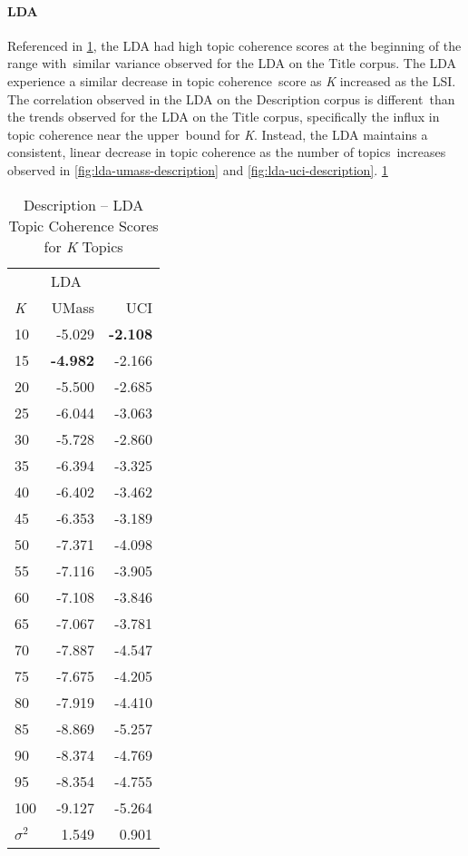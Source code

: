 \documentclass[letterpaper,12pt]{article}
\begin{document}
\paragraph{LDA}
Referenced in \ref{tab:lda_description_tc}, the LDA had high topic coherence scores at the beginning of the range with\
similar variance observed for the LDA on the Title corpus. The LDA experience a similar decrease in topic coherence\
score as \emph{K} increased as the LSI. The correlation observed in the LDA on the Description corpus is different\
than the trends observed for the LDA on the Title corpus, specifically the influx in topic coherence near the upper\
bound for \emph{K}. Instead, the LDA maintains a consistent, linear decrease in topic coherence as the number of topics\
increases observed in \ref{fig:lda-umass-description} and \ref{fig:lda-uci-description}.
\ref{tab:lda_description_tc}
\begin{table}
	\caption{\label{tab:lda_description_tc} Description -- LDA Topic Coherence Scores for \emph{K} Topics}
	\begin{center}
		\begin{tabular}{lrr}
			\toprule
			{} & \multicolumn{2}{l}{LDA} \\
			\emph{K} &  UMass &    UCI \\
			\midrule
			10  & -5.029 & \textbf{-2.108} \\
			15  & \textbf{-4.982} & -2.166 \\
			20  & -5.500 & -2.685 \\
			25  & -6.044 & -3.063 \\
			30  & -5.728 & -2.860 \\
			35  & -6.394 & -3.325 \\
			40  & -6.402 & -3.462 \\
			45  & -6.353 & -3.189 \\
			50  & -7.371 & -4.098 \\
			55  & -7.116 & -3.905 \\
			60  & -7.108 & -3.846 \\
			65  & -7.067 & -3.781 \\
			70  & -7.887 & -4.547 \\
			75  & -7.675 & -4.205 \\
			80  & -7.919 & -4.410 \\
			85  & -8.869 & -5.257 \\
			90  & -8.374 & -4.769 \\
			95  & -8.354 & -4.755 \\
			100 & -9.127 & -5.264 \\
			\midrule
			$\sigma^2$ & 1.549 & 0.901 \\
			\bottomrule
			\end{tabular}
	\end{center}
\end{table}
\end{document}
